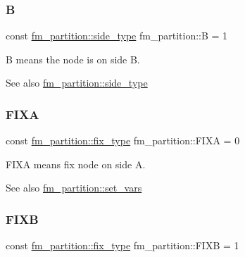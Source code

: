 \subsubsection{\texorpdfstring{B}{B}}
{\footnotesize\ttfamily const \mbox{\hyperlink{classfm__partition_a7cdff1bea3740a287387e8408e16ca79}{fm\+\_\+partition\+::side\+\_\+type}} fm\+\_\+partition\+::B = 1\hspace{0.3cm}{\ttfamily [static]}}

{\ttfamily B} means the node is on side B.

\begin{DoxySeeAlso}{See also}
\mbox{\hyperlink{classfm__partition_a7cdff1bea3740a287387e8408e16ca79}{fm\+\_\+partition\+::side\+\_\+type}} 
\end{DoxySeeAlso}
\mbox{\label{classfm__partition_a468a80e072d3ff18e5da33005825bcb1}} 
\subsubsection{\texorpdfstring{F\+I\+XA}{FIXA}}
{\footnotesize\ttfamily const \mbox{\hyperlink{classfm__partition_a63693cd93d587dca3d1842f831cd1c55}{fm\+\_\+partition\+::fix\+\_\+type}} fm\+\_\+partition\+::\+F\+I\+XA = 0\hspace{0.3cm}{\ttfamily [static]}}

{\ttfamily F\+I\+XA} means fix node on side {\ttfamily A}.

\begin{DoxySeeAlso}{See also}
\mbox{\hyperlink{classfm__partition_aa15471da2b6a0f14060b0c4091c6b05c}{fm\+\_\+partition\+::set\+\_\+vars}} 
\end{DoxySeeAlso}
\mbox{\label{classfm__partition_a0b9a66f0e8093ee83482f93d6aa5b2eb}} 
\subsubsection{\texorpdfstring{F\+I\+XB}{FIXB}}
{\footnotesize\ttfamily const \mbox{\hyperlink{classfm__partition_a63693cd93d587dca3d1842f831cd1c55}{fm\+\_\+partition\+::fix\+\_\+type}} fm\+\_\+partition\+::\+F\+I\+XB = 1\hspace{0.3cm}{\ttfamily [static]}}

